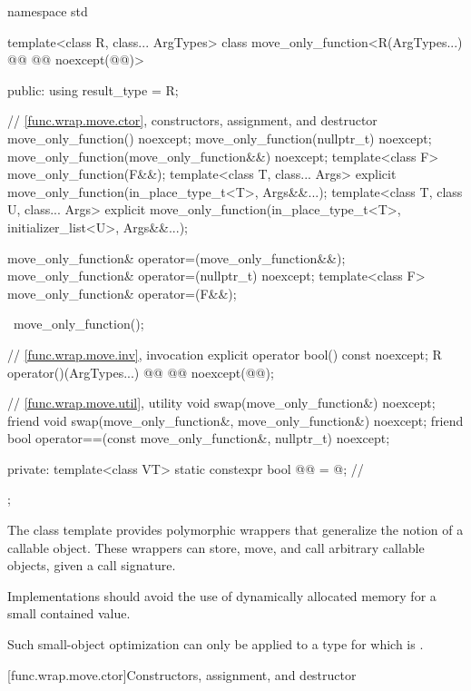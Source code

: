 %
\begin{codeblock}
namespace std {
  template<class R, class... ArgTypes>
  class move_only_function<R(ArgTypes...) @\cv{}@ @@ noexcept(@@)> {
  public:
    using result_type = R;

    // \ref{func.wrap.move.ctor}, constructors, assignment, and destructor
    move_only_function() noexcept;
    move_only_function(nullptr_t) noexcept;
    move_only_function(move_only_function&&) noexcept;
    template<class F> move_only_function(F&&);
    template<class T, class... Args>
      explicit move_only_function(in_place_type_t<T>, Args&&...);
    template<class T, class U, class... Args>
      explicit move_only_function(in_place_type_t<T>, initializer_list<U>, Args&&...);

    move_only_function& operator=(move_only_function&&);
    move_only_function& operator=(nullptr_t) noexcept;
    template<class F> move_only_function& operator=(F&&);

    ~move_only_function();

    // \ref{func.wrap.move.inv}, invocation
    explicit operator bool() const noexcept;
    R operator()(ArgTypes...) @\cv{}@ @@ noexcept(@@);

    // \ref{func.wrap.move.util}, utility
    void swap(move_only_function&) noexcept;
    friend void swap(move_only_function&, move_only_function&) noexcept;
    friend bool operator==(const move_only_function&, nullptr_t) noexcept;

  private:
    template<class VT>
      static constexpr bool @@ = @\seebelow@;       // \expos
  };
}
\end{codeblock}

\pnum
The  class template provides polymorphic wrappers
that generalize the notion of a callable object.
These wrappers can store, move, and call arbitrary callable objects,
given a call signature.

\pnum
\recommended
Implementations should avoid the use of dynamically allocated memory
for a small contained value.
\begin{note}
Such small-object optimization can only be applied to a type 
for which  is .
\end{note}

[func.wrap.move.ctor]{Constructors, assignment, and destructor}

